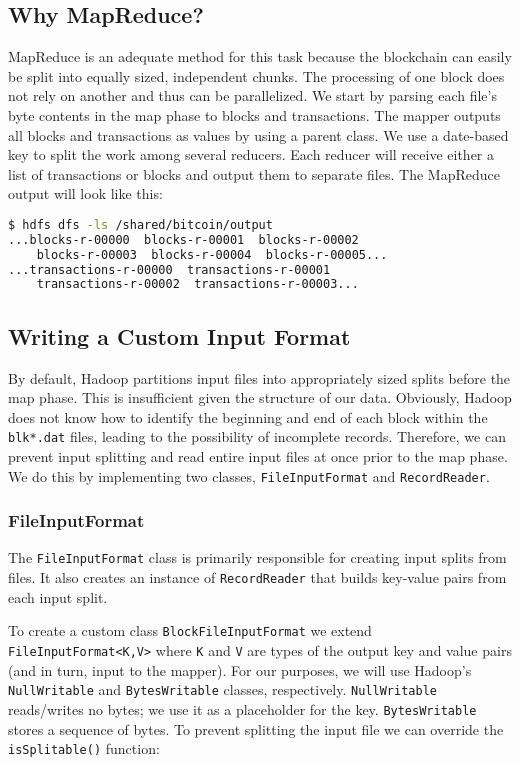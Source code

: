 \documentclass[9pt,twocolumn,twoside]{idsi}
\begin{document}
\subsection{Why MapReduce?}
MapReduce is an adequate method for this task because the blockchain can easily be split into equally sized, independent chunks. The processing of one block does not rely on another and thus can be parallelized. We start by parsing each file's byte contents in the map phase to blocks and transactions. The mapper outputs all blocks and transactions as values by using a parent  class. We use a date-based key to split the work among several reducers. Each reducer will receive either a list of transactions or blocks and output them to separate files. The MapReduce output will look like this:

\begin{lstlisting}[language=bash]
 $ hdfs dfs -ls /shared/bitcoin/output
...blocks-r-00000  blocks-r-00001  blocks-r-00002
    blocks-r-00003  blocks-r-00004  blocks-r-00005...
...transactions-r-00000  transactions-r-00001
    transactions-r-00002  transactions-r-00003...
\end{lstlisting}

\subsection{Writing a Custom Input Format}
By default, Hadoop partitions input files into appropriately sized splits before the map phase. This is insufficient given the structure of our data. Obviously, Hadoop does not know how to identify the beginning and end of each block within the \lstinline{blk*.dat} files, leading to the possibility of incomplete records. Therefore, we can prevent input splitting and read entire input files at once prior to the map phase. We do this by implementing two classes, \lstinline{FileInputFormat} and \lstinline{RecordReader}.

\subsubsection{FileInputFormat}
The \lstinline{FileInputFormat} class is primarily responsible for creating input splits from files. It also creates an instance of \lstinline{RecordReader} that builds key-value pairs from each input split.

To create a custom class \lstinline{BlockFileInputFormat} we extend \lstinline{FileInputFormat<K,V>} where \lstinline{K} and \lstinline{V} are types of the output key and value pairs (and in turn, input to the mapper). For our purposes, we will use Hadoop's \lstinline{NullWritable} and \lstinline{BytesWritable} classes, respectively. \lstinline{NullWritable} reads/writes no bytes; we use it as a placeholder for the key. \lstinline{BytesWritable} stores a sequence of bytes. To prevent splitting the input file we can override the \lstinline{isSplitable()} function:
\end{document}
